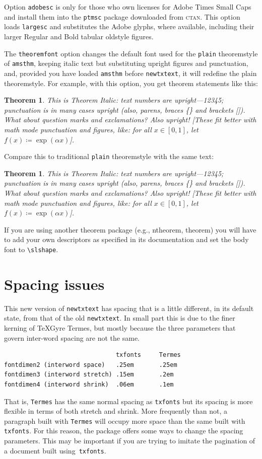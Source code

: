 \documentclass[11pt]{article}
\theoremstyle{oldplain}
\newtheorem{oldthm}{Theorem}[section]
\theoremstyle{plain}
\newtheorem{thm}{Theorem}[section]
\begin{document}
Option \texttt{adobesc} is only for those who own licenses for \textsf{Adobe Times Small Caps} and install them into the \texttt{ptmsc} package downloaded from \textsc{ctan}. This option loads \texttt{largesc} and substitutes the Adobe glyphs, where available, including their larger Regular and Bold tabular oldstyle figures.

The {\tt theoremfont} option changes the default font used for the {\tt plain} theoremstyle of {\tt amsthm}, keeping italic text but substituting upright figures and punctuation, and, provided you have loaded {\tt amsthm} before {\tt newtxtext}, it will redefine the plain theoremstyle.  For example, with this option, you get theorem statements like this:

\begin{thm}
This is Theorem Italic: text numbers are upright---12345; punctuation is in many cases upright (also, parens, braces \{\} and brackets []). What about question marks and exclamations? Also upright! [These fit better with math mode punctuation and figures, like: for all $x\in[0,1]$, let $f(x)\coloneq \exp(\alpha x)$].
\end{thm}
Compare this to traditional {\tt plain} theoremstyle with the same text:
\begin{oldthm}
This is Theorem Italic: text numbers are upright---12345; punctuation is in many cases upright (also, parens, braces \{\} and brackets []). What about question marks and exclamations? Also upright! [These fit better with math mode punctuation and figures, like: for all $x\in[0,1]$, let $f(x)\coloneq \exp(\alpha x)$].
\end{oldthm}

If you are using another theorem package (e.g., ntheorem, theorem) you will have to add your own descriptors as specified in its documentation and set the body font to \verb|\slshape|.

\section{Spacing issues}
This new version of {\tt newtxtext} has spacing that is a little different, in its default state, from that of the old {\tt newtxtext}. In small part this is due to the finer kerning of TeXGyre Termes, but mostly because the three parameters that govern inter-word spacing are not the same.
\begin{verbatim}
                               txfonts     Termes
fontdimen2 (interword space)   .25em       .25em
fontdimen3 (interword stretch) .15em       .2em
fontdimen4 (interword shrink)  .06em       .1em
\end{verbatim}
That is, {\tt Termes} has the same normal spacing as {\tt txfonts} but its spacing is more flexible in terms of both stretch and shrink. More frequently than not, a paragraph built with {\tt Termes} will occupy more space than the same built with {\tt txfonts}. For this reason, the package offers some ways to change the spacing parameters. This may be important if you are trying to imitate the pagination of a document built using~{\tt txfonts}.
\end{document}
